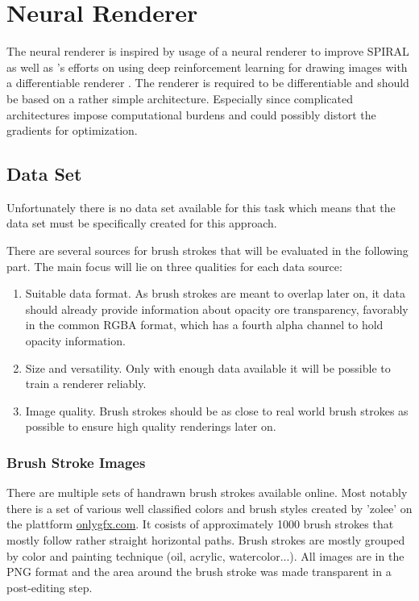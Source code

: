 \section{Neural Renderer}

The neural renderer is inspired by \citeauthor{NeuralPainters} usage of a neural renderer
to improve SPIRAL \cite{NeuralPainters} as well as \citeauthor*{Learning2Paint}'s efforts
on using deep reinforcement learning for drawing images with a differentiable renderer \cite{Learning2Paint}.
The renderer is required to be differentiable and should be based on a rather simple architecture.
Especially since complicated architectures impose computational burdens and could
possibly distort the gradients for optimization.

\subsection{Data Set}

Unfortunately there is no data set available for this task which means that the data set
must be specifically created for this approach.

There are several sources for brush strokes that will be evaluated in the following
part.
The main focus will lie on three qualities for each data source:
\begin{enumerate}
    \item Suitable data format. As brush strokes are meant to overlap later on, it
        data should already provide information about opacity ore transparency, favorably
        in the common RGBA format, which has a fourth alpha channel to hold opacity
        information.
    \item Size and versatility. Only with enough data available it will be possible
        to train a renderer reliably.
    \item Image quality. Brush strokes should be as close to real world brush strokes
        as possible to ensure high quality renderings later on.
\end{enumerate}

\subsubsection{Brush Stroke Images}

There are multiple sets of handrawn brush strokes available online.
Most notably there is a set of various well classified colors and brush styles created
by 'zolee'  on the plattform \url{onlygfx.com}.
It cosists of approximately 1000 brush strokes that mostly follow rather straight
horizontal paths.
Brush strokes are mostly grouped by color and painting technique (oil, acrylic, watercolor...).
All images are in the PNG format and the area around the brush stroke was made 
transparent in a post-editing step.

